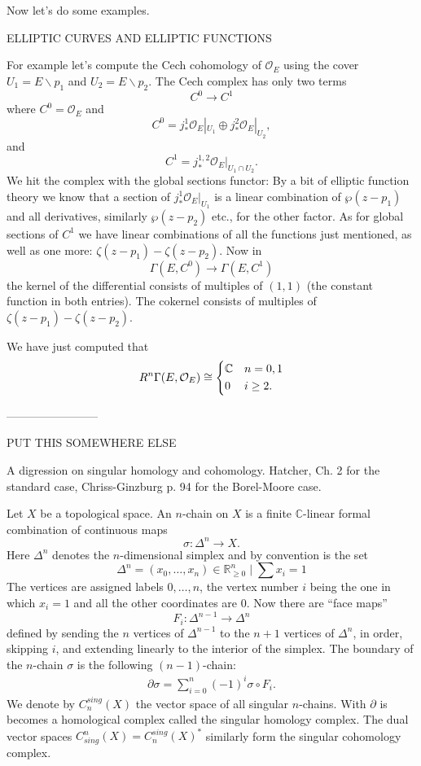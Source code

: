 \documentclass[12pt]{article}
\theoremstyle{plain}
\theoremstyle{definition}
\numberwithin{equation}{section}
\newcommand{\C}{\mathbb{C}}
\newcommand{\R}{\mathbb{R}}
\newcommand{\OO}{\mathcal{O}}
\begin{document}
Now let's do some examples.

{\color{blue}ELLIPTIC CURVES AND ELLIPTIC FUNCTIONS}

For example let's compute the Cech cohomology of $\OO_E$ using the cover $U_1 = E \backslash p_1$ and $U_2 = E \backslash p_2$. The Cech complex has only two terms
\[
C^0 \rightarrow C^1
\]
where $C^0 = \OO_E$ and
\[
C^0 = j^1_* {\OO_E}|_{U_1} \oplus j^2_* {\OO_E}|_{U_2},
\]
and
\[
C^1 = j^{1, 2}_* {\OO_E}|_{U_1 \cap U_2}.
\]
We hit the complex with the global sections functor: By a bit of elliptic function theory we know that a section of $j^1_* {\OO_E}|_{U_1}$ is a linear combination of $\wp(z-p_1)$ and all derivatives, similarly $\wp(z-p_2)$ etc., for the other factor. As for global sections of $C^1$ we have linear combinations of all the functions just mentioned, as well as one more: $\zeta(z-p_1) - \zeta(z-p_2)$. Now in
\[
\Gamma(E, C^0) \rightarrow \Gamma(E, C^1)
\]
the kernel of the differential consists of multiples of $(1, 1)$ (the constant function in both entries). The cokernel consists of multiples of $\zeta(z-p_1) - \zeta(z-p_2)$.

We have just computed that
\[
R^n\Gamma(E, \OO_E) \cong \begin{dcases}
\C & n=0,1 \\
0 & i \geq 2.
\end{dcases}
\]


------------------------

PUT THIS SOMEWHERE ELSE



A digression on singular homology and cohomology. Hatcher, Ch. 2 for the standard case, Chriss-Ginzburg p. 94 for the Borel-Moore case.



Let $X$ be a topological space. An $n$-chain on $X$ is a finite $\C$-linear formal combination of continuous maps
\[
\sigma : \Delta^n \rightarrow X.
\]
Here $\Delta^n$ denotes the $n$-dimensional simplex and by convention is the set
\[
\Delta^n = {(x_0, \ldots, x_n) \in \R_{\geq 0}^n \mid \sum x_i = 1}
\]
The vertices are assigned labels $0, \ldots, n$, the vertex number $i$ being the one in which $x_i = 1$ and all the other coordinates are $0$. Now there are ``face maps''
\[
F_i : \Delta^{n-1} \rightarrow \Delta^n
\]
defined by sending the $n$ vertices of $\Delta^{n-1}$ to the $n+1$ vertices of $\Delta^{n}$, in order, skipping $i$, and extending linearly to the interior of the simplex. The boundary of the $n$-chain $\sigma$ is the following $(n-1)$-chain:
\begin{align*}
\partial \sigma = \sum_{i=0}^n (-1)^{i} \sigma \circ F_i.
\end{align*}
We denote by $C^{sing}_n(X)$ the vector space of all singular $n$-chains. With $\partial$ is becomes a homological complex called the singular homology complex. The dual vector spaces $C_{sing}^n(X) = C^{sing}_n(X)^*$ similarly form the singular cohomology complex.
\end{document}
